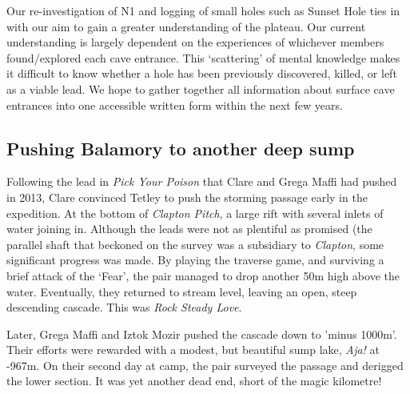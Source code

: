 \begin{figure}[b!]
\checkoddpage \ifoddpage \forcerectofloat \else \forceversofloat \fi
\centering
{}
\label{end of expo}
\end{figure}

Our re-investigation of N1 and logging of small holes such as Sunset Hole ties in with our aim to gain a greater understanding of the plateau. Our current understanding is largely dependent on the experiences of whichever members found/explored each cave entrance. This ‘scattering’ of mental knowledge makes it difficult to know whether a hole has been previously discovered, killed, or left as a viable lead. We hope to gather together all information about surface cave entrances into one accessible written form within the next few years.


\subsection{Pushing Balamory to another deep sump}
Following the lead in \emph{Pick Your Poison} that Clare and Grega Maffi had pushed in 2013, Clare convinced Tetley to push the storming passage early in the expedition. At the bottom of \emph{Clapton Pitch}, a large rift with several inlets of water joining in.  Although the leads were not as plentiful as promised (the parallel shaft that beckoned on the survey was a subsidiary to \emph{Clapton}, some significant progress was made. By playing the traverse game, and surviving a brief attack of the ‘Fear', the pair managed to drop another 50m high above the water. Eventually, they returned to stream level, leaving an open, steep descending cascade. This was \emph{Rock Steady Love}.

Later, Grega Maffi and Iztok Mozir pushed the cascade down to 'minus 1000m'. Their efforts were rewarded with a modest, but beautiful sump lake, \emph{Aja!} at -967m. On their second day at camp, the pair surveyed the passage and derigged the lower section. It was yet another dead end, short of the magic kilometre!

